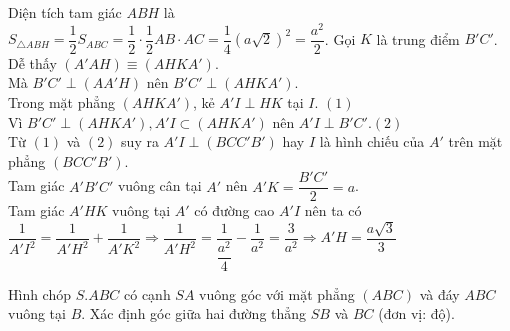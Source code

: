 \begin{ex}
{\begin{itemchoice}
			 Diện tích tam giác $ABH$ là\\
			$S_{\triangle ABH}=\dfrac{1}{2}S_{ABC}=\dfrac{1}{2}\cdot \dfrac{1}{2}AB\cdot  AC=\dfrac{1}{4}(a\sqrt{2})^2=\dfrac{a^2}{2}$.
			\itemch  Gọi $K$ là trung điểm $B'C'$.\\
			Dễ thấy $\left(A'AH\right)\equiv\left(AHKA'\right)$.\\ 
			Mà $B'C'\perp\left(AA'H\right)$ nên $B'C'\perp\left(AHKA'\right)$.\\ 
			Trong mặt phẳng $\left(AHKA'\right)$, kẻ $A'I\perp HK$ tại  $I$. \hfill $(1)$\\
			Vì $B'C'\perp\left(AHKA'\right),A'I\subset\left(AHKA'\right)$  nên $A'I\perp B'C'$.\hfill $(2)$\\
			Từ $(1)$ và $(2)$ suy ra $A'I\perp\left(BCC'B'\right)$ hay $I$ là hình chiếu  của $A'$ trên mặt phẳng $\left(BCC'B'\right)$.\\
			Tam giác $A'B'C'$ vuông cân tại  $A'$ nên $A'K=\dfrac{B'C'}{2}=a$.\\
			Tam giác $A'HK$ vuông tại $A'$ có đường cao $A'I$ nên ta có\\ 
			$\dfrac{1}{A'I^2}=\dfrac{1}{A'H^2}+\dfrac{1}{A'K^2}\Rightarrow  \dfrac{1}{A'H^2}=\dfrac{1}{\dfrac{a^2}{4}}-\dfrac{1}{a^2}=\dfrac{3}{a^2}\Rightarrow A'H=\dfrac{a\sqrt{3}}{3}$
		\end{itemchoice}
	 }
\end{ex}



\begin{ex}%
	Hình chóp $S.A B C $ có cạnh $S A$ vuông góc với mặt phẳng $(A B C)$ và đáy $A B C$ vuông tại  $B$. Xác định góc giữa hai đường thẳng $SB$ và $BC$ (đơn vị: độ).
\end{ex}

